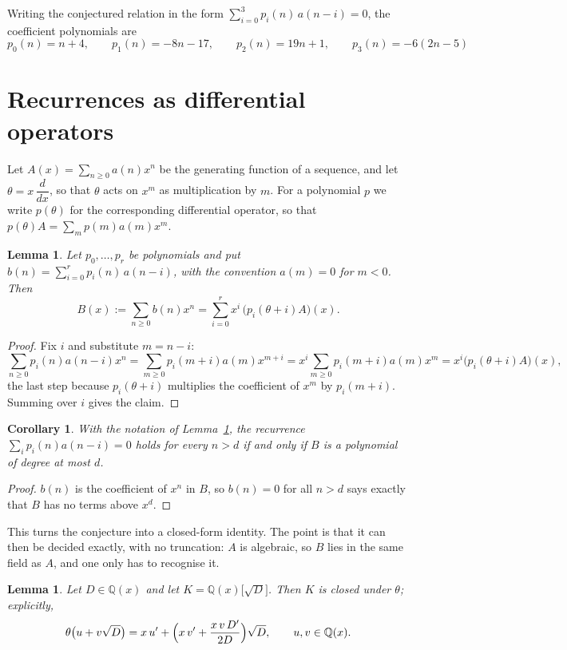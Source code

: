 \documentclass[11pt,a4paper]{article}
\theoremstyle{plain}
\newtheorem{lemma}[theorem]{Lemma}
\newtheorem{corollary}[theorem]{Corollary}
\theoremstyle{definition}
\begin{document}
Writing the conjectured relation in the form $\sum_{i=0}^{3}p_{i}(n)\,a(n-i)=0$,
the coefficient polynomials are
\[
p_{0}(n)=n + 4,\qquad p_{1}(n)=- 8 n - 17,\qquad p_{2}(n)=19 n + 1,\qquad p_{3}(n)=- 6 \left(2 n - 5\right)
\]

\section{Recurrences as differential operators}

Let $A(x)=\sum_{n\ge0}a(n)x^{n}$ be the generating function of a sequence, and let
$\theta=x\,\dfrac{d}{dx}$, so that $\theta$ acts on $x^{m}$ as multiplication by $m$. For a
polynomial $p$ we write $p(\theta)$ for the corresponding differential operator, so that
$p(\theta)A=\sum_{m}p(m)a(m)x^{m}$.

\begin{lemma}\label{lem:transfer}
Let $p_{0},\dots,p_{r}$ be polynomials and put $b(n)=\sum_{i=0}^{r}p_{i}(n)\,a(n-i)$, with
the convention $a(m)=0$ for $m<0$. Then
\[
B(x):=\sum_{n\ge0}b(n)x^{n}=\sum_{i=0}^{r}x^{i}\,\bigl(p_{i}(\theta+i)A\bigr)(x).
\]
\end{lemma}

\begin{proof}
Fix $i$ and substitute $m=n-i$:
\[
\sum_{n\ge0}p_{i}(n)a(n-i)x^{n}=\sum_{m\ge0}p_{i}(m+i)a(m)x^{m+i}
=x^{i}\sum_{m\ge0}p_{i}(m+i)a(m)x^{m}=x^{i}\bigl(p_{i}(\theta+i)A\bigr)(x),
\]
the last step because $p_{i}(\theta+i)$ multiplies the coefficient of $x^{m}$ by
$p_{i}(m+i)$. Summing over $i$ gives the claim.
\end{proof}

\begin{corollary}\label{cor:criterion}
With the notation of Lemma~\ref{lem:transfer}, the recurrence
$\sum_{i}p_{i}(n)a(n-i)=0$ holds for every $n>d$ if and only if $B$ is a polynomial of
degree at most $d$.
\end{corollary}

\begin{proof}
$b(n)$ is the coefficient of $x^{n}$ in $B$, so $b(n)=0$ for all $n>d$ says exactly that
$B$ has no terms above $x^{d}$.
\end{proof}

This turns the conjecture into a closed-form identity. The point is that it can then be
decided exactly, with no truncation: $A$ is algebraic, so $B$ lies in the same field as
$A$, and one only has to recognise it.

\begin{lemma}\label{lem:field}
Let $D\in\mathbb{Q}(x)$ and let $K=\mathbb{Q}(x)\bigl[\sqrt{D}\bigr]$. Then $K$ is closed
under $\theta$; explicitly,
\[
\theta\bigl(u+v\sqrt{D}\bigr)=x\,u'+\Bigl(x\,v'+\frac{x\,v\,D'}{2D}\Bigr)\sqrt{D},
\qquad u,v\in\mathbb{Q}(x).
\]
\end{lemma}
\end{document}
